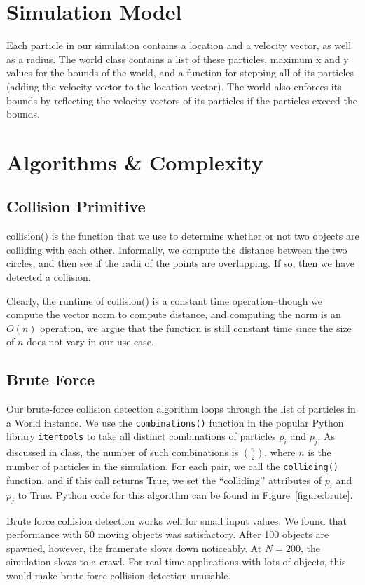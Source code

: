     \section{Simulation Model}
      Each particle in our simulation contains a location and a velocity
      vector, as well as a radius. The world class contains a list of
      these particles, maximum x and y values for the bounds of the
      world, and a function for stepping all of its particles (adding
      the velocity vector to the location vector). The world also
      enforces its bounds by reflecting the velocity vectors of its
      particles if the particles exceed the bounds.

    \section{Algorithms \& Complexity}
      \subsection{Collision Primitive}
	collision() is the function that we use to determine whether or
	not two objects are colliding with each other. Informally, we
	compute the distance between the two circles, and then see if
	the radii of the points are overlapping. If so, then we have
	detected a collision.
	\par Clearly, the runtime of collision() is a constant time
	operation--though we compute the vector norm to compute
	distance, and computing the norm is an $O(n)$ operation, we
	argue that the function is still constant time since the size of
	$n$ does not vary in our use case.

      \subsection{Brute Force}
	Our brute-force collision detection algorithm loops through the
	list of particles in a World instance. We use the
	\texttt{combinations()} function in the popular Python library
	\texttt{itertools} to take all distinct combinations of
	particles $p_i$ and $p_j$. As discussed in class, the number of
	such combinations is ${n \choose 2}$, where $n$ is the number of
	particles in the simulation. For each pair, we call the
	\texttt{colliding()} function, and if this call returns True, we
	set the ``colliding’’ attributes of $p_i$ and $p_j$ to True.
	Python code for this algorithm can be found in
	Figure~\ref{figure:brute}.

	\par Brute force collision detection works well for small input
	values. We found that performance with 50 moving objects was
	satisfactory. After 100 objects are spawned, however, the
	framerate slows down noticeably. At $N = 200$, the simulation
	slows to a crawl. For real-time applications with lots of
	objects, this would make brute force collision detection
	unusable.

